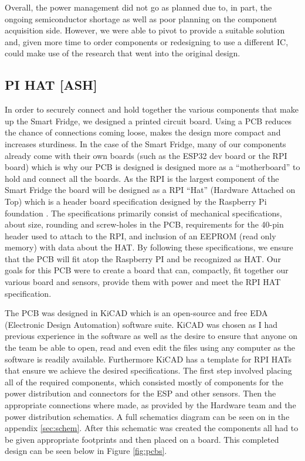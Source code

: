 Overall, the power management did not go as planned due to, in part, the ongoing semiconductor shortage as well as poor planning on the component acquisition side.
However, we were able to pivot to provide a suitable solution and, given more time to order components or redesigning to use a different IC, could make use of the research that went into the original design.

\subsection{PI HAT [ASH]}

In order to securely connect and hold together the various components that make up the Smart Fridge, we designed a printed circuit board.
Using a PCB reduces the chance of connections coming loose, makes the design more compact and increases sturdiness.
In the case of the Smart Fridge, many of our components already come with their own boards (such as the ESP32 dev board or the RPI board) which is why our PCB is designed is designed more as a “motherboard” to hold and connect all the boards.
As the RPI is the largest component of the Smart Fridge the board will be designed as a RPI “Hat” (Hardware Attached on Top) which is a header board specification designed by the Raspberry Pi foundation \cite{}.
The specifications primarily consist of mechanical specifications, about size, rounding and screw-holes in the PCB, requirements for the 40-pin header used to attach to the RPI, and inclusion of an EEPROM (read only memory) with data about the HAT.
By following these specifications, we ensure that the PCB will fit atop the Raspberry PI and be recognized as HAT.
Our goals for this PCB were to create a board that can, compactly, fit together our various board and sensors, provide them with power and meet the RPI HAT specification.

The PCB was designed in KiCAD which is an open-source and free EDA (Electronic Design Automation) software suite.
KiCAD was chosen as I had previous experience in the software as well as the desire to ensure that anyone on the team be able to open, read and even edit the files using any computer as the software is readily available.
Furthermore KiCAD has a template for RPI HATs that ensure we achieve the desired specifications.
The first step involved placing all of the required components, which consisted mostly of components for the power distribution and connectors for the ESP and other sensors.
Then the appropriate connections where made, as provided by the Hardware team and the power distribution schematics.
A full schematics diagram can be seen on in the appendix \ref{sec:schem}.
After this schematic was created the components all had to be given appropriate footprints and then placed on a board.
This completed design can be seen below in Figure \ref{fig:pcbs}.


